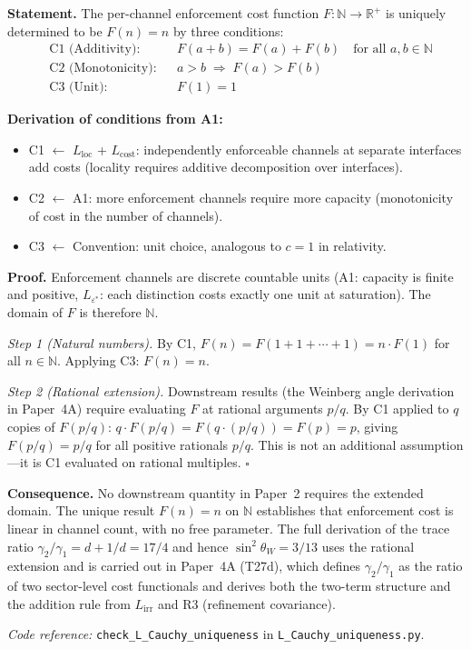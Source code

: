 \documentclass[11pt]{article}
\newenvironment{varlist}{\begin{itemize}[nosep,leftmargin=2em]}{\end{itemize}}
\newcommand{\coderef}[2]{\smallskip\noindent\textit{Code reference:} \texttt{#1} in \texttt{#2}.}
\begin{document}
\begin{tcolorbox}[apfbox, title={Lemma $L_{\mathrm{Cauchy}}$ (Cost Function Uniqueness)}]
\textbf{Statement.}  The per-channel enforcement cost function $F: \mathbb{N} \to \mathbb{R}^+$ is uniquely determined to be $F(n) = n$ by three conditions:
\begin{align}
&\text{C1 (Additivity):} &&F(a + b) = F(a) + F(b) \quad \text{for all } a, b \in \mathbb{N} \label{eq:C1}\\
&\text{C2 (Monotonicity):} &&a > b \;\Rightarrow\; F(a) > F(b) \label{eq:C2}\\
&\text{C3 (Unit):} &&F(1) = 1 \label{eq:C3}
\end{align}

\smallskip\noindent\textbf{Derivation of conditions from A1:}
\begin{varlist}
\item C1 $\leftarrow$ $L_{\mathrm{loc}}$ + $L_{\mathrm{cost}}$: independently enforceable channels at separate interfaces add costs (locality requires additive decomposition over interfaces).
\item C2 $\leftarrow$ A1: more enforcement channels require more capacity (monotonicity of cost in the number of channels).
\item C3 $\leftarrow$ Convention: unit choice, analogous to $c = 1$ in relativity.
\end{varlist}

\smallskip\noindent\textbf{Proof.}  Enforcement channels are discrete countable units (A1: capacity is finite and positive, $L_{\varepsilon^*}$: each distinction costs exactly one unit at saturation).  The domain of $F$ is therefore $\mathbb{N}$.

\textit{Step 1 (Natural numbers).}  By C1, $F(n) = F(1 + 1 + \cdots + 1) = n \cdot F(1)$ for all $n \in \mathbb{N}$.  Applying C3: $F(n) = n$.

\textit{Step 2 (Rational extension).}  Downstream results (the Weinberg angle derivation in Paper~4A) require evaluating $F$ at rational arguments $p/q$.  By C1 applied to $q$ copies of $F(p/q)$: $q \cdot F(p/q) = F(q \cdot (p/q)) = F(p) = p$, giving $F(p/q) = p/q$ for all positive rationals $p/q$.  This is not an additional assumption---it is C1 evaluated on rational multiples.  $\square$

\smallskip\noindent\textbf{Consequence.}  No downstream quantity in Paper~2 requires the extended domain.  The unique result $F(n) = n$ on $\mathbb{N}$ establishes that enforcement cost is linear in channel count, with no free parameter.  The full derivation of the trace ratio $\gamma_2/\gamma_1 = d + 1/d = 17/4$ and hence $\sin^2\theta_W = 3/13$ uses the rational extension and is carried out in Paper~4A (T27d), which defines $\gamma_2/\gamma_1$ as the ratio of two sector-level cost functionals and derives both the two-term structure and the addition rule from $L_{\mathrm{irr}}$ and R3 (refinement covariance).

\coderef{check\_L\_Cauchy\_uniqueness}{L\_Cauchy\_uniqueness.py}
\end{tcolorbox}
\end{document}
